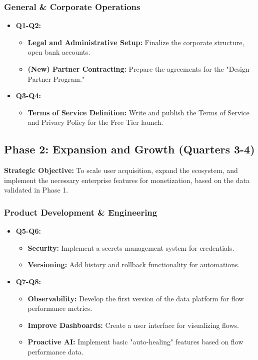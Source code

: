 \documentclass[11pt, a4paper, oneside]{article}
\begin{document}
\subsubsection{General \& Corporate Operations}
\begin{itemize}[leftmargin=*]
    \item \textbf{Q1-Q2:}
    \begin{itemize}
        \item \textbf{Legal and Administrative Setup:} Finalize the corporate structure, open bank accounts.
        \item \textbf{(New) Partner Contracting:} Prepare the agreements for the "Design Partner Program."
    \end{itemize}
    \item \textbf{Q3-Q4:}
    \begin{itemize}
        \item \textbf{Terms of Service Definition:} Write and publish the Terms of Service and Privacy Policy for the Free Tier launch.
    \end{itemize}
\end{itemize}

\clearpage

\subsection{Phase 2: Expansion and Growth (Quarters 3-4)}
\textbf{Strategic Objective:} To scale user acquisition, expand the ecosystem, and implement the necessary enterprise features for monetization, based on the data validated in Phase 1.

\subsubsection{Product Development \& Engineering}
\begin{itemize}[leftmargin=*]
    \item \textbf{Q5-Q6:}
    \begin{itemize}
        \item \textbf{Security:} Implement a secrets management system for credentials.
        \item \textbf{Versioning:} Add history and rollback functionality for automations.
    \end{itemize}
    \item \textbf{Q7-Q8:}
    \begin{itemize}
        \item \textbf{Observability:} Develop the first version of the data platform for flow performance metrics.
        \item \textbf{Improve Dashboards:} Create a user interface for visualizing flows.
        \item \textbf{Proactive AI:} Implement basic "auto-healing" features based on flow performance data.
    \end{itemize}
\end{itemize}
\end{document}
